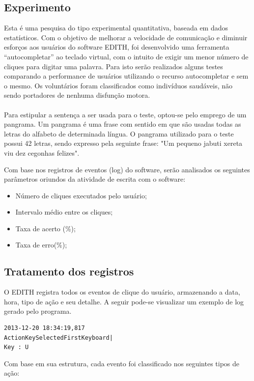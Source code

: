 \documentclass[twoside]{article}
\begin{document}
\begin{multicols}{2}
\subsection{Experimento}
Esta é uma pesquisa do tipo experimental quantitativa, baseada em dados estatísticos. Com o objetivo de melhorar a velocidade de comunicação e diminuir esforços aos usuários do software EDITH, foi desenvolvido uma ferramenta “autocompletar” ao teclado virtual, com o intuito de exigir um menor número de cliques para digitar uma palavra. Para isto serão realizados alguns testes comparando a performance de usuários utilizando o recurso autocompletar e sem o mesmo. Os voluntários foram classificados como indivíduos saudáveis, não sendo portadores de nenhuma disfunção motora. 
\\\\
Para estipular a sentença a ser usada para o teste, optou-se pelo emprego de um pangrama. Um pangrama é uma frase com sentido em que são usadas todas as letras do alfabeto de determinada língua. O pangrama utilizado para o teste possui 42 letras, sendo expresso pela seguinte frase: "Um pequeno jabuti xereta viu dez cegonhas felizes". 

Com base nos registros de eventos (log) do software, serão analisados os seguintes parâmetros oriundos da atividade de escrita com o software:
\begin{itemize}
\item Número de cliques executados pelo usuário;
\item Intervalo médio entre os cliques;
\item Taxa de acerto (\%);
\item Taxa de erro(\%);
\end{itemize}

\subsection{Tratamento dos registros}

O EDITH registra todos os eventos de clique do usuário, armazenando a data, hora, tipo de ação e seu detalhe. A seguir pode-se visualizar um exemplo de log gerado pelo programa.

\begin{lstlisting}
2013-12-20 18:34:19,817 
ActionKeySelectedFirstKeyboard|
Key : U
\end{lstlisting}

Com base em sua estrutura, cada evento foi classificado nos seguintes tipos de ação:
\begin{itemize}


\end{itemize}
\end{multicols}
\end{document}
